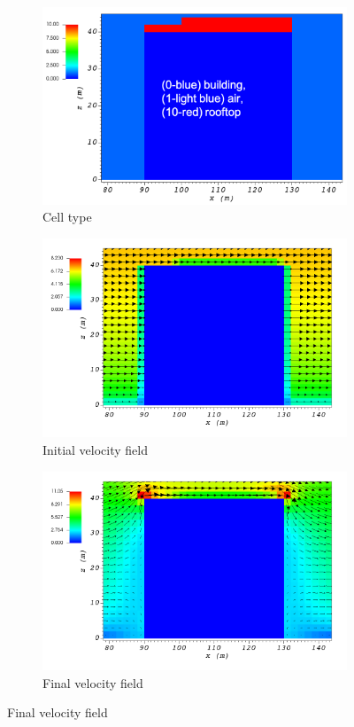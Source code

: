 \documentclass[14pt,landscape]{report}
\begin{document}
\begin{figure}[p]
    \centering
    \begin{subfigure}[t]{0.45\textwidth}
    \centering
    \includegraphics[width=10.3cm,keepaspectratio]{Images/rooftop_y_100_1_init_icell.png}
    \caption{Cell type}
    \end{subfigure}
    \begin{subfigure}[t]{0.45\textwidth}
    \centering
    \includegraphics[width=11.0cm,keepaspectratio]{Images/rooftop_y_100_1_init_vel.png}
    \caption{Initial velocity field}
    \end{subfigure}
    \begin{subfigure}[t]{0.45\textwidth}
    \centering
    \includegraphics[width=11.0cm,keepaspectratio]{Images/rooftop_y_100_1_final.png}
    \caption{Final velocity field}
    \end{subfigure}
\end{figure}
\end{document}
